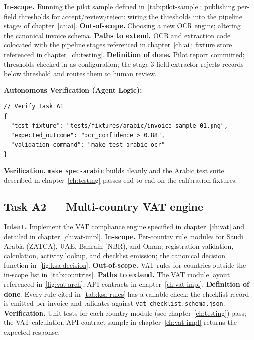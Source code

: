\documentclass[11pt,a4paper,twoside]{report}
\begin{document}
\textbf{In-scope.} Running the pilot sample defined
in~\ref{tab:pilot-sample}; publishing per-field thresholds for
accept/review/reject; wiring the thresholds into the pipeline stages
of chapter~\ref{ch:ai}.
\textbf{Out-of-scope.} Choosing a new OCR engine; altering the
canonical invoice schema.
\textbf{Paths to extend.} OCR and extraction code colocated with the
pipeline stages referenced in chapter~\ref{ch:ai}; fixture store
referenced in chapter~\ref{ch:testing}.
\textbf{Definition of done.} Pilot report committed; thresholds
checked in as configuration; the stage-3 field extractor rejects
records below threshold and routes them to human review.

\textbf{Autonomous Verification (Agent Logic):}
\begin{lstlisting}[language=jsonx]
// Verify Task A1
{
  "test_fixture": "tests/fixtures/arabic/invoice_sample_01.png",
  "expected_outcome": "ocr_confidence > 0.88",
  "validation_command": "make test-arabic-ocr"
}
\end{lstlisting}

\textbf{Verification.} \texttt{make spec-arabic} builds cleanly and
the Arabic test suite described in chapter~\ref{ch:testing} passes
end-to-end on the calibration fixtures.

\subsection*{Task A2 --- Multi-country VAT engine}
\textbf{Intent.} Implement the VAT compliance engine specified in
chapter~\ref{ch:vat} and detailed in chapter~\ref{ch:vat-impl}.
\textbf{In-scope.} Per-country rule modules for Saudi Arabia (ZATCA),
UAE, Bahrain (NBR), and Oman; registration validation, calculation,
activity lookup, and checklist emission; the canonical decision
function in~\ref{fig:ksa-decision}.
\textbf{Out-of-scope.} VAT rules for countries outside the in-scope
list in~\ref{tab:countries}.
\textbf{Paths to extend.} The VAT module layout referenced
in~\ref{fig:vat-arch}; API contracts in chapter~\ref{ch:vat-impl}.
\textbf{Definition of done.} Every rule cited
in~\ref{tab:ksa-rules} has a callable check; the checklist record is
emitted per invoice and validates against
\texttt{vat-checklist.schema.json}.
\textbf{Verification.} Unit tests for each country module (see
chapter~\ref{ch:testing}) pass; the VAT calculation API contract
sample in chapter~\ref{ch:vat-impl} returns the expected response.
\end{document}

